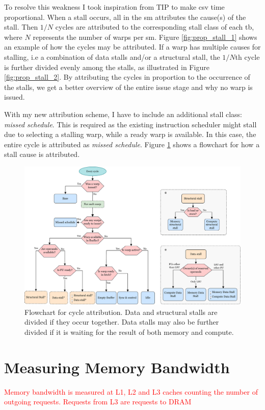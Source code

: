 \noindent
To resolve this weakness I took inspiration from TIP\cite{TIP} to make \acrshort{csv} time proportional. When a stall occurs, all  in the \acrshort{sm} attributes the cause(s) of the stall. Then $1/N$ cycles are attributed to the corresponding stall class of each \acrshort{tb}, where $N$ represents the number of warps per \acrshort{sm}. Figure \ref{fig:prop_stall_1} shows an example of how the cycles may be attributed. If a warp has multiple causes for stalling, i.e a combination of data stalls and/or a structural stall, the $1/N$th cycle is further divided evenly among the stalls, as illustrated in Figure \ref{fig:prop_stall_2}. By attributing the cycles in proportion to the occurrence of the stalls, we get a better overview of the entire issue stage and why no warp is issued.

With my new attribution scheme, I have to include an additional stall class: \textit{missed schedule}. This is required as the existing instruction scheduler might stall due to selecting a stalling warp, while a ready warp is available. In this case, the entire cycle is attributed as \textit{missed schedule}. Figure \ref{fig:cpi_flowchart} shows a flowchart for how a stall cause is attributed.

\begin{figure}
    \centering
    \includegraphics[width=\textwidth]{figures/flowchart_grouped_v2.png}
    \caption[Flowchart for cycle \acrshort{csv}'s cycle attribution.]{Flowchart for cycle attribution. Data and structural stalls are divided if they occur together. Data stalls may also be further divided if it is waiting for the result of both memory and compute.}
    \label{fig:cpi_flowchart}
\end{figure}

\section{Measuring Memory Bandwidth}

\textcolor{red}{Memory bandwidth is measured at L1, L2 and L3 caches counting the number of outgoing requests. Requests from L3 are requests to DRAM}